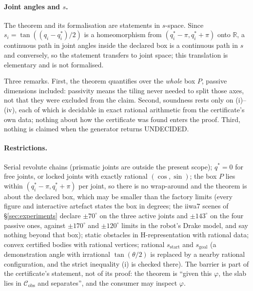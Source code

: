 \documentclass[10pt,twocolumn,letterpaper]{article}
\newcommand{\Cobs}{\mathcal{C}_{\mathrm{obs}}}
\newcommand{\Rr}{\mathbb{R}}
\newcommand{\vphi}{\varphi}
\newif\ifhl \hlfalse  %
\newcommand{\new}[1]{\ifhl{\color{blue!65!black}#1}\else#1\fi}
\begin{document}
\paragraph{Joint angles and $s$.} \new{The theorem and its formalisation are statements in $s$-space. Since $s_i=\tan((q_i-q^*_i)/2)$ is a homeomorphism from $(q^*_i-\pi,q^*_i+\pi)$ onto $\Rr$, a continuous path in joint angles inside the declared box is a continuous path in $s$ and conversely, so the statement transfers to joint space; this translation is elementary and is not formalised.}

Three remarks. First, the theorem quantifies over the \emph{whole} box $P$, passive dimensions included: passivity means the tiling never needed to split those axes, not that they were excluded from the claim. Second, soundness rests only on (i)--(iv), each of which is decidable in exact rational arithmetic from the certificate's own data; nothing about how the certificate was found enters the proof. Third, nothing is claimed when the generator returns UNDECIDED.

\paragraph{Restrictions.} Serial revolute chains (prismatic joints are outside the present scope); $q^*=0$ for free joints, or locked joints with exactly rational $(\cos,\sin)$; the box $P$ lies within $(q^*_i-\pi,q^*_i+\pi)$ per joint, so there is no wrap-around and the theorem is about the declared box, which may be smaller than the factory limits (every figure and interactive artefact states the box in degrees\new{; the iiwa7 scenes of \S\ref{sec:experiments} declare $\pm70^\circ$ on the three active joints and $\pm143^\circ$ on the four passive ones, against $\pm170^\circ$ and $\pm120^\circ$ limits in the robot's Drake model, and say nothing beyond that box}); static obstacles in H-representation with rational data; convex certified bodies with rational vertices; rational $s_{\mathrm{start}}$ and $s_{\mathrm{goal}}$ (a demonstration angle with irrational $\tan(\theta/2)$ is replaced by a nearby rational configuration, and the strict inequality (i) is checked there). The barrier is part of the certificate's statement, not of its proof: the theorem is ``given this $\vphi$, the slab lies in $\Cobs$ and separates'', and the consumer may inspect $\vphi$.
\end{document}
